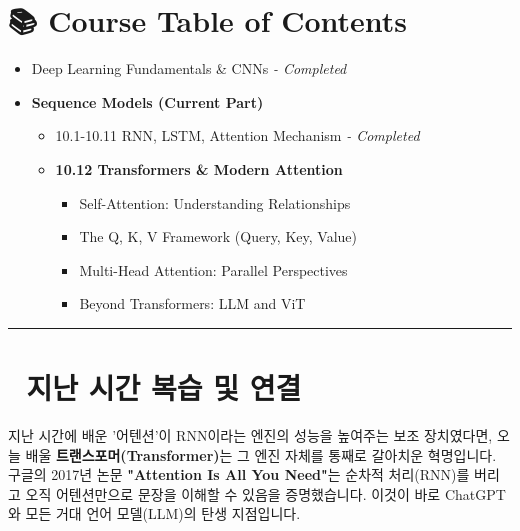 \documentclass[11pt,a4paper]{book}
\theoremstyle{definition}
\begin{document}
\section*{📚 Course Table of Contents}
\begin{itemize}
    \item[Chapter 1-9.] Deep Learning Fundamentals \& CNNs \textit{- Completed}
    \item[\textbf{Chapter 10.}] \textbf{Sequence Models (Current Part)}
    \begin{itemize}
        \item 10.1-10.11 RNN, LSTM, Attention Mechanism \textit{- Completed}
        \item \textbf{10.12 Transformers \& Modern Attention}
        \begin{itemize}
            \item Self-Attention: Understanding Relationships
            \item The Q, K, V Framework (Query, Key, Value)
            \item Multi-Head Attention: Parallel Perspectives
            \item Beyond Transformers: LLM and ViT
        \end{itemize}
    \end{itemize}
\end{itemize}

\vspace{0.5cm}
\hrule
\vspace{0.5cm}

\section*{🔗 지난 시간 복습 및 연결}
지난 시간에 배운 '어텐션'이 RNN이라는 엔진의 성능을 높여주는 보조 장치였다면, 오늘 배울 \textbf{트랜스포머(Transformer)}는 그 엔진 자체를 통째로 갈아치운 혁명입니다. 
구글의 2017년 논문 \textbf{"Attention Is All You Need"}는 순차적 처리(RNN)를 버리고 오직 어텐션만으로 문장을 이해할 수 있음을 증명했습니다. 이것이 바로 ChatGPT와 모든 거대 언어 모델(LLM)의 탄생 지점입니다.

\end{document}
